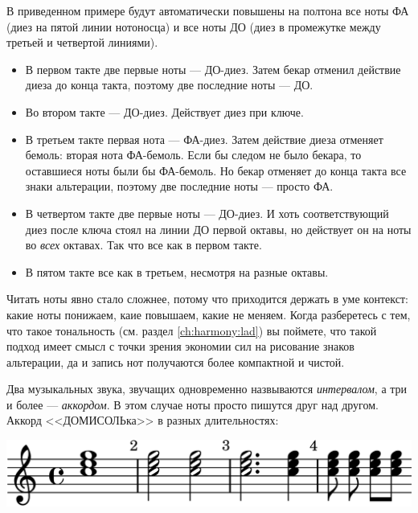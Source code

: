 В приведенном примере будут автоматически повышены на полтона все ноты ФА (диез на пятой линии нотоносца) и все ноты ДО (диез в промежутке между третьей и четвертой линиями).
\begin{itemize}
    \item В первом такте две первые ноты --- ДО-диез. Затем бекар отменил действие диеза до конца такта, поэтому две последние ноты --- ДО.
    
    \item Во втором такте --- ДО-диез. Действует диез при ключе.
    
    \item В третьем такте первая нота --- ФА-диез. Затем действие диеза отменяет бемоль: вторая нота ФА-бемоль. Если бы следом не было бекара, то оставшиеся ноты были бы ФА-бемоль. Но бекар отменяет до конца такта все знаки альтерации, поэтому две последние ноты --- просто ФА.
    
    \item В четвертом такте две первые ноты --- ДО-диез. И хоть соответствующий диез после ключа стоял на линии ДО первой октавы, но действует он на ноты во \emph{всех} октавах. Так что все как в первом такте.
    
    \item В пятом такте все как в третьем, несмотря на разные октавы.
\end{itemize}

Читать ноты явно стало сложнее, потому что приходится держать в уме контекст: какие ноты понижаем, каие повышаем, какие не меняем. Когда разберетесь с тем, что такое тональность (см. раздел \ref{ch:harmony:lad}) вы поймете, что такой подход имеет смысл с точки зрения экономии сил на рисование знаков альтерации, да и запись нот получаются более компактной и чистой.

Два музыкальных звука, звучащих одновременно назвываются \emph{интервалом}, а три и более --- \emph{аккордом}. В этом случае ноты просто пишутся друг над другом. Аккорд <<ДОМИСОЛЬка>> в разных длительностях:
\begin{center}
    \includegraphics{fig/notes/chord}
\end{center}

